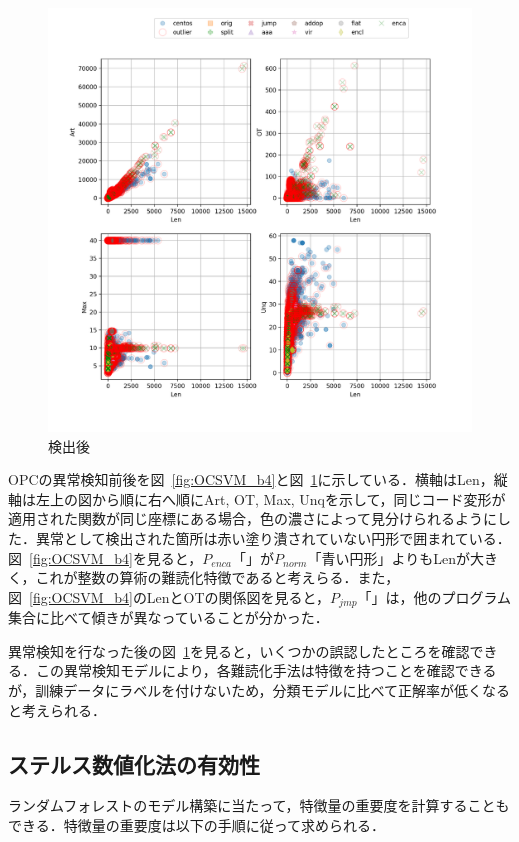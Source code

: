 \documentclass[12pt]{jarticle}
\begin{document}
\begin{figure}[bhtp]
  \includegraphics[width=17cm]{opc_OCSVM_all.pdf}
  \caption{検出後}
  \label{fig:OCSVM_af}
\end{figure}

OPCの異常検知前後を図~\ref{fig:OCSVM_b4}と図~\ref{fig:OCSVM_af}に示している．横軸はLen，縦軸は左上の図から順に右へ順にArt, OT, Max, Unqを示して，同じコード変形が適用された関数が同じ座標にある場合，色の濃さによって見分けられるようにした．異常として検出された箇所は赤い塗り潰されていない円形で囲まれている．図~\ref{fig:OCSVM_b4}を見ると，$P_{enca}$「」が$P_{norm}$「青い円形」よりもLenが大きく，これが整数の算術の難読化特徴であると考えらる．また，図~\ref{fig:OCSVM_b4}のLenとOTの関係図を見ると，$P_{jmp}$「」は，他のプログラム集合に比べて傾きが異なっていることが分かった．

異常検知を行なった後の図~\ref{fig:OCSVM_af}を見ると，いくつかの誤認したところを確認できる．この異常検知モデルにより，各難読化手法は特徴を持つことを確認できるが，訓練データにラベルを付けないため，分類モデルに比べて正解率が低くなると考えられる．

\subsection{ステルス数値化法の有効性}
ランダムフォレストのモデル構築に当たって，特徴量の重要度を計算することもできる．特徴量の重要度は以下の手順に従って求められる．
\end{document}
